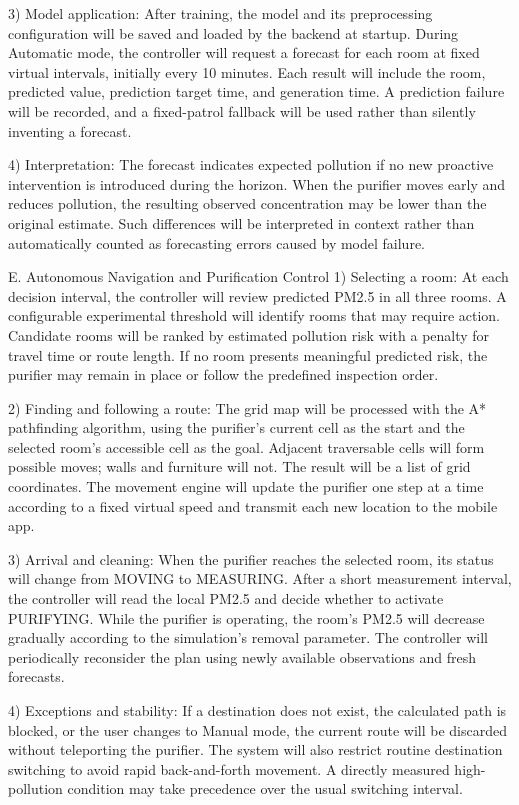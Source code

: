 3) Model application:
After training, the model and its preprocessing configuration will be saved and loaded by the backend at startup. During Automatic mode, the controller will request a forecast for each room at fixed virtual intervals, initially every 10 minutes. Each result will include the room, predicted value, prediction target time, and generation time. A prediction failure will be recorded, and a fixed-patrol fallback will be used rather than silently inventing a forecast.

4) Interpretation:
The forecast indicates expected pollution if no new proactive intervention is introduced during the horizon. When the purifier moves early and reduces pollution, the resulting observed concentration may be lower than the original estimate. Such differences will be interpreted in context rather than automatically counted as forecasting errors caused by model failure.

E. Autonomous Navigation and Purification Control
1) Selecting a room:
At each decision interval, the controller will review predicted PM2.5 in all three rooms. A configurable experimental threshold will identify rooms that may require action. Candidate rooms will be ranked by estimated pollution risk with a penalty for travel time or route length. If no room presents meaningful predicted risk, the purifier may remain in place or follow the predefined inspection order.

2) Finding and following a route: 
The grid map will be processed with the A* pathfinding algorithm, using the purifier's current cell as the start and the selected room's accessible cell as the goal. Adjacent traversable cells will form possible moves; walls and furniture will not. The result will be a list of grid coordinates. The movement engine will update the purifier one step at a time according to a fixed virtual speed and transmit each new location to the mobile app.

3) Arrival and cleaning: 
When the purifier reaches the selected room, its status will change from MOVING to MEASURING. After a short measurement interval, the controller will read the local PM2.5 and decide whether to activate PURIFYING. While the purifier is operating, the room's PM2.5 will decrease gradually according to the simulation's removal parameter. The controller will periodically reconsider the plan using newly available observations and fresh forecasts.

4) Exceptions and stability:
If a destination does not exist, the calculated path is blocked, or the user changes to Manual mode, the current route will be discarded without teleporting the purifier. The system will also restrict routine destination switching to avoid rapid back-and-forth movement. A directly measured high-pollution condition may take precedence over the usual switching interval.

